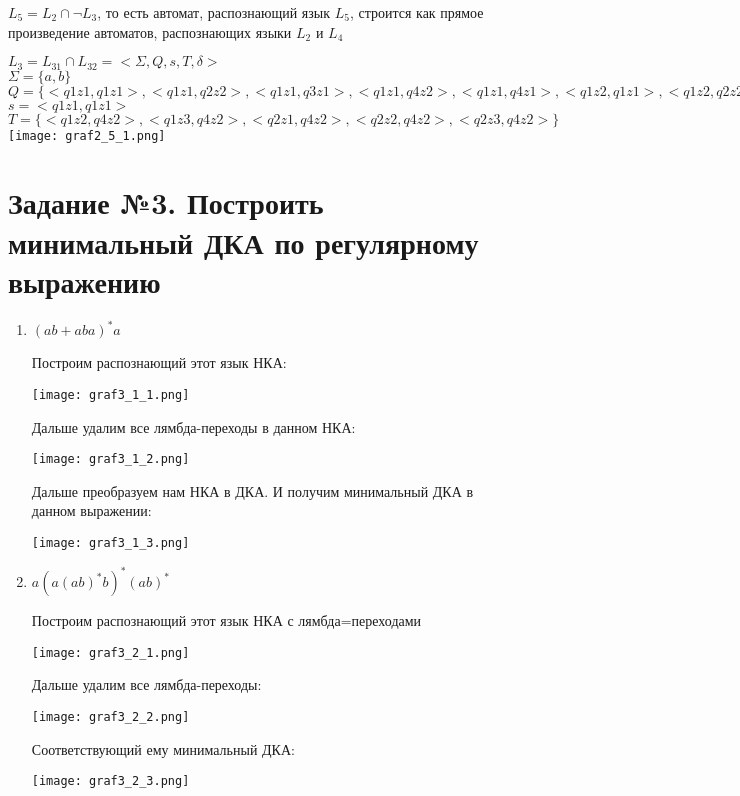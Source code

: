 \documentclass[12pt]{article}
\begin{document}
\begin{enumerate}
    $L_5 = L_2 \cap \lnot L_3$, то есть автомат, распознающий язык $L_5$, строится как прямое произведение автоматов, распознающих языки $L_2$ и $L_4$
    \begin{flushleft}
        $L_3 = L_{31} \cap L_{32} = <\Sigma, Q, s, T, \delta>$ \\
        $\Sigma = \{a, b\}$\\
        $Q = \{<q1z1, q1z1>, <q1z1,q2z2>, <q1z1, q3z1>, <q1z1, q4z2>, <q1z1, q4z1>, <q1z2, q1z1>, <q1z2,q2z2>, <q1z2, q3z1>, <q1z2, q4z2>, <q1z2, q4z1, <q1z3, q1z1>, <q1z3,q2z2>, <q1z3, q3z1>, <q1z3, q4z2>, <q1z3, q4z1>, <q2z1, q2z1>, <q2z1,q2z2>, <q2z1, q3z1>, <q2z1, q4z2>, <q2z1, q4z1>, <q2z2, q1z1>, <q2z2,q2z2>, <q2z2, q3z1>, <q2z2, q4z2>, <q2z2, q4z1>,   <q3z3, q1z1>, <q1z3,q2z2>, <q3z3, q3z1>, <q3z3, q4z2>, <q3z3, q4z1>\}$\\
        $s = <q1z1, q1z1>$\\
        $T = \{<q1z2, q4z2>, <q1z3, q4z2>, <q2z1, q4z2>, <q2z2, q4z2>, <q2z3, q4z2>\}$\\
       
        \texttt{[image: graf2\_5\_1.png]}
    \end{flushleft}
    \section{Задание №3. Построить минимальный ДКА по регулярному выражению}
\begin{enumerate}
    \item $(ab + aba)^*a$
    
    Построим распознающий этот язык НКА:
    \begin{center}
        \texttt{[image: graf3\_1\_1.png]}
    \end{center}
    Дальше удалим все лямбда-переходы в данном НКА:
    \begin{center}
        \texttt{[image: graf3\_1\_2.png]}
    \end{center}
    
    Дальше преобразуем нам НКА в ДКА. И получим минимальный ДКА в данном выражении: 

    \begin{center}
        \texttt{[image: graf3\_1\_3.png]}
    \end{center}

    \item $a(a(ab)^*b)^*(ab)^*$
    
    Построим распознающий этот язык НКА с лямбда=переходами
    \begin{center}
        \texttt{[image: graf3\_2\_1.png]}
    \end{center}
    Дальше удалим все лямбда-переходы:
    \begin{center}
        \texttt{[image: graf3\_2\_2.png]}
    \end{center}
    Соответствующий ему минимальный ДКА:
    \begin{center}
        \texttt{[image: graf3\_2\_3.png]}
    \end{center}
    

\end{enumerate}
\end{enumerate}
\end{document}
